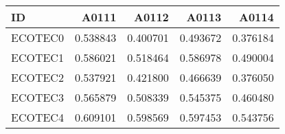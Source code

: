 \begin{tabular}{lrrrr}
\toprule
     ID &    A0111 &    A0112 &    A0113 &    A0114 \\
\midrule
ECOTEC0 & 0.538843 & 0.400701 & 0.493672 & 0.376184 \\
ECOTEC1 & 0.586021 & 0.518464 & 0.586978 & 0.490004 \\
ECOTEC2 & 0.537921 & 0.421800 & 0.466639 & 0.376050 \\
ECOTEC3 & 0.565879 & 0.508339 & 0.545375 & 0.460480 \\
ECOTEC4 & 0.609101 & 0.598569 & 0.597453 & 0.543756 \\
\bottomrule
\end{tabular}
